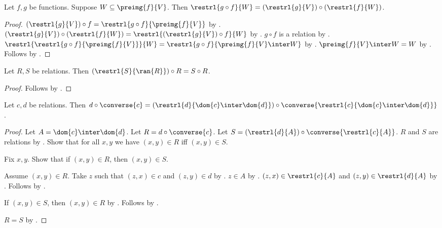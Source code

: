 \begin{theorem}\label{partial_composition_local_restriction}
    Let $f,g$ be functions.
    Suppose $W\subseteq\preimg{f}{V}$.
    Then $\restrl{g\circ f}{W}=(\restrl{g}{V})\circ(\restrl{f}{W})$.
\end{theorem}
\begin{proof}
    $(\restrl{g}{V})\circ f=\restrl{g\circ f}{\preimg{f}{V}}$ by
        .
    $(\restrl{g}{V})\circ(\restrl{f}{W})
        =\restrl{(\restrl{g}{V})\circ f}{W}$ by .
    $g\circ f$ is a relation by .
    $\restrl{\restrl{g\circ f}{\preimg{f}{V}}}{W}
        =\restrl{g\circ f}{\preimg{f}{V}\inter W}$ by
        .
    $\preimg{f}{V}\inter W=W$ by .
    Follows by \auto.
\end{proof}

\begin{theorem}\label{composition_restrict_intermediate_range}
    Let $R,S$ be relations.
    Then $(\restrl{S}{\ran{R}})\circ R=S\circ R$.
\end{theorem}
\begin{proof}
    Follows by .
\end{proof}

\begin{theorem}\label{transition_restrict_overlap}
    Let $c,d$ be relations.
    Then $d\circ\converse{c}
        =(\restrl{d}{\dom{c}\inter\dom{d}})
            \circ\converse{\restrl{c}{\dom{c}\inter\dom{d}}}$.
\end{theorem}
\begin{proof}
    Let $A=\dom{c}\inter\dom{d}$.
    Let $R=d\circ\converse{c}$.
    Let $S=(\restrl{d}{A})\circ\converse{\restrl{c}{A}}$.
    $R$ and $S$ are relations by .
    Show that for all $x,y$ we have $(x,y)\in R$ iff $(x,y)\in S$.
    \begin{subproof}
        Fix $x,y$.
        Show that if $(x,y)\in R$, then $(x,y)\in S$.
        \begin{subproof}
            Assume $(x,y)\in R$.
            Take $z$ such that $(z,x)\in c$ and $(z,y)\in d$ by
                .
            $z\in A$ by .
            $(z,x)\in\restrl{c}{A}$ and $(z,y)\in\restrl{d}{A}$ by
                .
            Follows by .
        \end{subproof}
        If $(x,y)\in S$, then $(x,y)\in R$ by
            .
        Follows by \auto.
    \end{subproof}
    $R=S$ by .
\end{proof}

